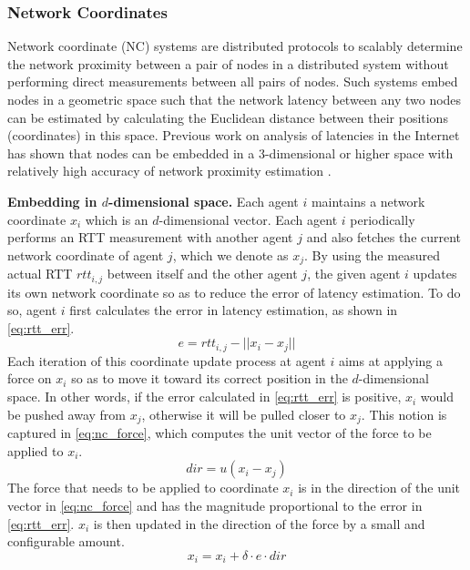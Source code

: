 \subsubsection{Network Coordinates}
Network coordinate (NC) systems are distributed protocols to scalably determine the network proximity between a pair of nodes in a distributed system without performing direct measurements \cite{donnet2010survey} between all pairs of nodes. Such systems embed nodes in a geometric space such that the network latency between any two nodes can be estimated by calculating the Euclidean distance between their positions (coordinates) in this space. Previous work on analysis of latencies in the Internet has shown that nodes can be embedded in a 3-dimensional or higher space with relatively high accuracy of network proximity estimation \cite{lee2009suitability}.
\par \noindent \textbf{Embedding in $d$-dimensional space. } Each agent $i$ maintains a network coordinate $x_i$ which is an $d$-dimensional vector. Each agent $i$ periodically performs an RTT measurement with another agent $j$ and also fetches the current network coordinate of agent $j$, which we denote as $x_j$. By using the measured actual RTT $rtt_{i,j}$ between itself and the other agent $j$, the given agent $i$ updates its own network coordinate so as to reduce the error of latency estimation. To do so, agent $i$ first calculates the error in latency estimation, as shown in \cref{eq:rtt_err}.
\begin{equation}
e = rtt_{i,j} - || x_i - x_j ||
\label{eq:rtt_err}
\end{equation}
Each iteration of this coordinate update process at agent $i$ aims at applying a force on $x_i$ so as to move it toward its correct position in the $d$-dimensional space. In other words, if the error calculated in \cref{eq:rtt_err} is positive, $x_i$ would be pushed away from $x_j$, otherwise it will be pulled closer to $x_j$. This notion is captured in \cref{eq:nc_force}, which computes the unit vector of the force to be applied to $x_i$.
\begin{equation}
dir = u \left( x_i - x_j \right) 
\label{eq:nc_force}
\end{equation}
The force that needs to be applied to coordinate $x_i$ is in the direction of the unit vector in \cref{eq:nc_force} and has the magnitude proportional to the error in \cref{eq:rtt_err}. $x_i$ is then updated in the direction of the force by a small and configurable amount.
\begin{equation}
x_i = x_i + \delta \cdot e \cdot dir 
\label{eq:nc_update}
\end{equation}

